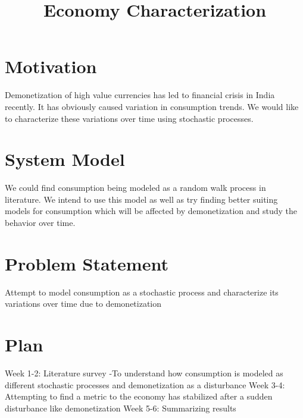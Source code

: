 \documentclass[a4paper,english,12pt]{article}
\title{Economy Characterization}
\author{}
\begin{document}
\maketitle

\section{Motivation}
Demonetization of high value currencies has led to financial crisis in India recently. It has obviously caused variation in consumption trends. We would like to characterize these variations over time using stochastic processes.
\section{System Model}
We could find consumption being modeled as a random walk process in literature. We intend to use this model as well as try finding better suiting models for consumption which will be affected by demonetization and study the behavior over time.  
\section{Problem Statement}
Attempt to model consumption as a stochastic process and characterize its variations over time due to demonetization


\section{Plan}
Week 1-2: Literature survey -To understand how consumption is modeled as different stochastic processes and demonetization as a disturbance\newline
Week 3-4: Attempting to find a metric to the economy has stabilized after a sudden disturbance like demonetization\newline
Week 5-6: Summarizing results
\end{document}
